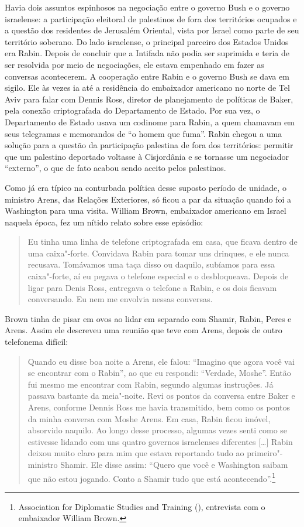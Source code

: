 Havia dois assuntos espinhosos na negociação entre o governo Bush e o
governo israelense: a participação eleitoral de palestinos de fora
dos territórios ocupados e a questão dos residentes de Jerusalém
Oriental, vista por Israel como parte de seu território soberano. Do
lado israelense, o principal parceiro dos Estados Unidos era Rabin.
Depois de concluir que a Intifada não podia ser suprimida e teria de
ser resolvida por meio de negociações, ele estava empenhado em fazer as
conversas acontecerem. A cooperação entre Rabin e o governo Bush se dava
em sigilo. Ele às vezes ia até a residência do embaixador americano no
norte de Tel Aviv para falar com Dennis Ross, diretor de planejamento
de políticas de Baker, pela conexão criptografada do Departamento de
Estado. Por sua vez, o Departamento de Estado usava um codinome para
Rabin, a quem chamavam em seus telegramas e memorandos de ``o homem que
fuma''. Rabin chegou a uma solução para a questão da participação
palestina de fora dos territórios: permitir que um palestino deportado
voltasse à Cisjordânia e se tornasse um negociador ``externo'', o que de
fato acabou sendo aceito pelos palestinos.

Como já era típico na conturbada política desse suposto período de
unidade, o ministro Arens, das Relações Exteriores, só ficou a par da
situação quando foi a Washington para uma visita. William Brown,
embaixador americano em Israel naquela época, fez um nítido relato sobre
esse episódio:

\begin{quote}
Eu tinha uma linha de telefone criptografada em casa, que ficava dentro
de uma caixa"-forte. Convidava Rabin para tomar uns drinques, e ele
nunca recusava. Tomávamos uma taça disso ou daquilo, subíamos para essa
caixa"-forte, aí eu pegava o telefone especial e o desbloqueava. Depois
de ligar para Denis Ross, entregava o telefone a Rabin, e os dois
ficavam conversando. Eu nem me envolvia nessas conversas.
\end{quote}

Brown tinha de pisar em ovos ao lidar em separado com Shamir, Rabin,
Peres e Arens. Assim ele descreveu uma reunião que teve com Arens,
depois de outro telefonema difícil:

\begin{quote}
Quando eu disse boa noite a Arens, ele falou: ``Imagino que agora você
vai se encontrar com o Rabin'', ao que eu respondi: ``Verdade, Moshe''.
Então fui mesmo me encontrar com Rabin, segundo algumas instruções. Já
passava bastante da meia"-noite. Revi os pontos da conversa entre Baker e
Arens, conforme Dennis Ross me havia transmitido, bem como os pontos da
minha conversa com Moshe Arens. Em casa, Rabin ficou imóvel, absorvido
naquilo. Ao longo desse processo, algumas vezes senti como se estivesse
lidando com uns quatro governos israelenses diferentes {[}\ldots{}{]} Rabin deixou
muito claro para mim que estava reportando tudo ao primeiro"-ministro
Shamir. Ele disse assim: ``Quero que você e Washington saibam que não
estou jogando. Conto a Shamir tudo que está acontecendo''.\footnote{Association
  for Diplomatic Studies and Training (), entrevista com o embaixador William Brown.}
\end{quote}

